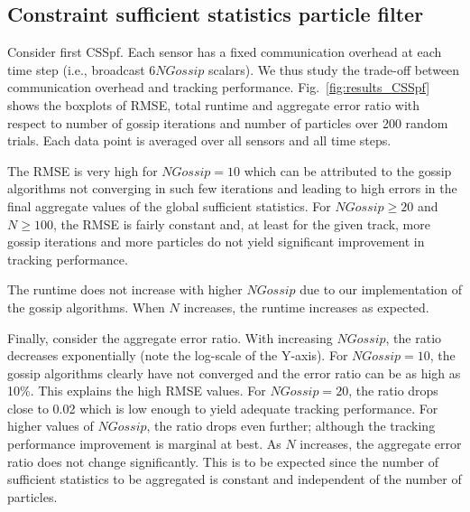 \documentclass[10pt,letterpaper,final]{article}
\begin{document}
\subsection{Constraint sufficient statistics particle filter}
Consider first CSSpf. Each sensor has a fixed communication overhead at each time step (i.e., broadcast 6$NGossip$ scalars). We thus study the trade-off between communication overhead and tracking performance. Fig.~\ref{fig:results_CSSpf} shows the boxplots of RMSE, total runtime and aggregate error ratio with respect to number of gossip iterations and number of particles over 200 random trials. Each data point is averaged over all sensors and all time steps. 

The RMSE is very high for $NGossip=10$ which can be attributed to the gossip algorithms not converging in such few iterations and leading to high errors in the final aggregate values of the global sufficient statistics. For $NGossip\geq 20$ and $N\geq 100$, the RMSE is fairly constant and, at least for the given track, more gossip iterations and more particles do not yield significant improvement in tracking performance. 

The runtime does not increase with higher $NGossip$ due to our implementation of the gossip algorithms. When $N$ increases, the runtime increases as expected. 

Finally, consider the aggregate error ratio. With increasing $NGossip$, the ratio decreases exponentially (note the log-scale of the Y-axis). For $NGossip=10$, the gossip algorithms clearly have not converged and the error ratio can be as high as 10\%. This explains the high RMSE values. For $NGossip=20$, the ratio drops close to 0.02 which is low enough to yield adequate tracking performance. For higher values of $NGossip$, the ratio drops even further; although the tracking performance improvement is marginal at best. As $N$ increases, the aggregate error ratio does not change significantly. This is to be expected since the number of sufficient statistics to be aggregated is constant and independent of the number of particles. 
\end{document}

